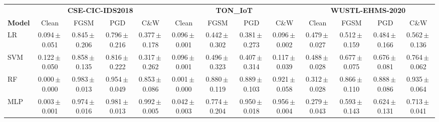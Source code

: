 \begin{tabular}{lcccccccccccc}
\toprule
 & \multicolumn{4}{c}{\textbf{CSE-CIC-IDS2018}} & \multicolumn{4}{c}{\textbf{TON\_IoT}} & \multicolumn{4}{c}{\textbf{WUSTL-EHMS-2020}} \\
\cmidrule(lr){2-5}\cmidrule(lr){6-9}\cmidrule(lr){10-13}
\textbf{Model} & Clean & FGSM & PGD & C\&W & Clean & FGSM & PGD & C\&W & Clean & FGSM & PGD & C\&W \\
\midrule
LR & 0.094\,$\pm$\,0.051 & 0.845\,$\pm$\,0.206 & 0.796\,$\pm$\,0.216 & 0.377\,$\pm$\,0.178 & 0.096\,$\pm$\,0.001 & 0.442\,$\pm$\,0.302 & 0.381\,$\pm$\,0.273 & 0.096\,$\pm$\,0.002 & 0.479\,$\pm$\,0.027 & 0.512\,$\pm$\,0.159 & 0.484\,$\pm$\,0.166 & 0.562\,$\pm$\,0.136 \\
SVM & 0.122\,$\pm$\,0.050 & 0.858\,$\pm$\,0.135 & 0.816\,$\pm$\,0.222 & 0.317\,$\pm$\,0.262 & 0.096\,$\pm$\,0.001 & 0.496\,$\pm$\,0.323 & 0.407\,$\pm$\,0.314 & 0.117\,$\pm$\,0.039 & 0.488\,$\pm$\,0.028 & 0.677\,$\pm$\,0.075 & 0.676\,$\pm$\,0.081 & 0.764\,$\pm$\,0.062 \\
RF & 0.000\,$\pm$\,0.000 & 0.983\,$\pm$\,0.013 & 0.954\,$\pm$\,0.049 & 0.853\,$\pm$\,0.086 & 0.001\,$\pm$\,0.000 & 0.880\,$\pm$\,0.119 & 0.889\,$\pm$\,0.103 & 0.921\,$\pm$\,0.058 & 0.312\,$\pm$\,0.028 & 0.866\,$\pm$\,0.110 & 0.888\,$\pm$\,0.086 & 0.935\,$\pm$\,0.064 \\
MLP & 0.003\,$\pm$\,0.001 & 0.974\,$\pm$\,0.016 & 0.981\,$\pm$\,0.013 & 0.992\,$\pm$\,0.005 & 0.042\,$\pm$\,0.003 & 0.774\,$\pm$\,0.204 & 0.950\,$\pm$\,0.018 & 0.956\,$\pm$\,0.004 & 0.279\,$\pm$\,0.043 & 0.593\,$\pm$\,0.143 & 0.624\,$\pm$\,0.131 & 0.713\,$\pm$\,0.041 \\
\bottomrule
\end{tabular}